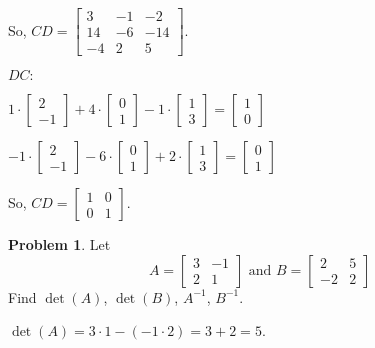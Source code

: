 \documentclass[12]{amsart}
\theoremstyle{definition}
\newtheorem{xca}{Problem}
\newcommand{\sskip}{\newpage}
\begin{document}
So, $CD = \begin{bmatrix}
    3 & -1 & -2 \\
    14 & -6 & -14 \\
    -4 & 2 & 5
\end{bmatrix}$.

$DC:$

$1 \cdot \begin{bmatrix}
    2 \\
    -1
\end{bmatrix} + 4 \cdot \begin{bmatrix}
    0 \\
    1
\end{bmatrix} -1 \cdot \begin{bmatrix}
    1 \\
    3
\end{bmatrix} = \begin{bmatrix}
    1 \\
    0
\end{bmatrix}$

$-1 \cdot \begin{bmatrix}
    2 \\
    -1
\end{bmatrix} -6 \cdot \begin{bmatrix}
    0 \\
    1
\end{bmatrix} + 2 \cdot \begin{bmatrix}
    1 \\
    3
\end{bmatrix} = \begin{bmatrix}
    0 \\
    1
\end{bmatrix}$

So, $CD = \begin{bmatrix}
    1 & 0 \\
    0 & 1
\end{bmatrix}$.


\sskip
\begin{xca}
Let
$$
A=
\begin{bmatrix}
3 & -1\\
2 & 1
\end{bmatrix}
\text{ and } B=
\begin{bmatrix}
2 & 5 \\
-2 & 2
\end{bmatrix}
$$
Find  $\det(A)$, $\det(B)$, $A^{-1}$, $B^{-1}$.
\end{xca}


$\det(A) = 3 \cdot 1 - (-1 \cdot 2) = 3 + 2 = 5$.
\end{document}
